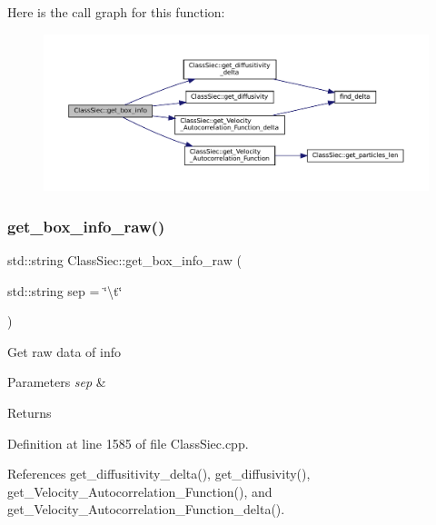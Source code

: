 Here is the call graph for this function\+:\nopagebreak
\begin{figure}[H]
\begin{center}
\leavevmode
\includegraphics[width=350pt]{classClassSiec_a5228f0e683612ae0a947f77a2bb7d2c9_cgraph}
\end{center}
\end{figure}
\mbox{\label{classClassSiec_a1e4fd45f66e131050359072b706f7608}} 
\subsubsection{\texorpdfstring{get\+\_\+box\+\_\+info\+\_\+raw()}{get\_box\_info\_raw()}}
{\footnotesize\ttfamily std\+::string Class\+Siec\+::get\+\_\+box\+\_\+info\+\_\+raw (\begin{DoxyParamCaption}\item[{std\+::string}]{sep = {\ttfamily \char`\"{}\textbackslash{}t\char`\"{}} }\end{DoxyParamCaption})}

Get raw data of info 
\begin{DoxyParams}{Parameters}
{\em sep} & \\
\hline
\end{DoxyParams}
\begin{DoxyReturn}{Returns}

\end{DoxyReturn}


Definition at line 1585 of file Class\+Siec.\+cpp.



References get\+\_\+diffusitivity\+\_\+delta(), get\+\_\+diffusivity(), get\+\_\+\+Velocity\+\_\+\+Autocorrelation\+\_\+\+Function(), and get\+\_\+\+Velocity\+\_\+\+Autocorrelation\+\_\+\+Function\+\_\+delta().



